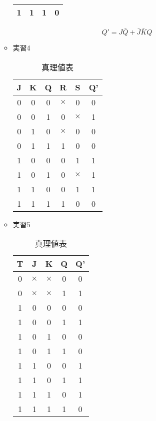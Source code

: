 \documentclass[dvipdfmx]{jsarticle}
\begin{document}
\begin{enumerate}
\begin{itemize}
\begin{table}[H]
\begin{tabular}{|c|c|c|c|}
								1 & 1 & 1 & 0 \\ \hline
							\end{tabular}
						\end{table}
						\begin{equation}
							Q' = J \bar{Q} + \bar{J} \bar{K} Q
						\end{equation}
					\item 実習4
						\begin{table}[H]
							\center
							\caption{真理値表}
							\begin{tabular}{|c|c|c|c|c|c|}
								\hline
								J & K & Q & R & S & Q' \\ \hline
								0 & 0 & 0 & $\times$ & 0 & 0 \\ \hline
								0 & 0 & 1 & 0 & $\times$& 1 \\ \hline
								0 & 1 & 0 & $\times$ & 0 & 0 \\ \hline
								0 & 1 & 1 & 1 & 0 & 0 \\ \hline
								1 & 0 & 0 & 0 & 1 & 1 \\ \hline
								1 & 0 & 1 & 0 & $\times$ & 1 \\ \hline
								1 & 1 & 0 & 0 & 1 & 1 \\ \hline
								1 & 1 & 1 & 1 & 0 & 0 \\ \hline
							\end{tabular}
						\end{table}
					\item 実習5
						\begin{table}[H]
							\center
							\caption{真理値表}
							\begin{tabular}{|c|c|c|c|c|}
								\hline
								T & J & K & Q & Q' \\ \hline
								0 & $\times$ & $\times$ & 0 & 0 \\ \hline
								0 & $\times$ & $\times$ & 1 & 1 \\ \hline
								1 & 0 & 0 & 0 & 0 \\ \hline
								1 & 0 & 0 & 1 & 1 \\ \hline
								1 & 0 & 1 & 0 & 0 \\ \hline
								1 & 0 & 1 & 1 & 0 \\ \hline
								1 & 1 & 0 & 0 & 1 \\ \hline
								1 & 1 & 0 & 1 & 1 \\ \hline
								1 & 1 & 1 & 0 & 1 \\ \hline
								1 & 1 & 1 & 1 & 0 \\ \hline
							\end{tabular}

\end{table}
\end{itemize}
\end{enumerate}
\end{document}
